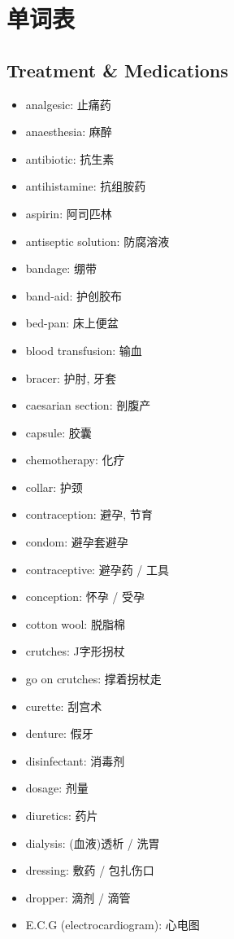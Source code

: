 \chapter{单词表}
\section{Treatment \& Medications}
\begin{multicols}{2}
\begin{itemize}
  \itemsep0em
  \item analgesic: 止痛药
  \item anaesthesia: 麻醉
  \item antibiotic: 抗生素
  \item antihistamine: 抗组胺药
  \item aspirin: 阿司匹林
  \item antiseptic solution: 防腐溶液
  \item bandage: 绷带
  \item band-aid: 护创胶布
  \item bed-pan: 床上便盆
  \item blood transfusion: 输血
  \item bracer: 护肘, 牙套
  \item caesarian section: 剖腹产
  \item capsule: 胶囊
  \item chemotherapy: 化疗
  \item collar: 护颈
  \item contraception: 避孕, 节育
  \item condom: 避孕套避孕
  \item contraceptive: 避孕药 / 工具
  \item conception: 怀孕 / 受孕
  \item cotton wool: 脱脂棉
  \item crutches: J字形拐杖
  \item go on crutches: 撑着拐杖走
  \item curette: 刮宫术
  \item denture: 假牙
  \item disinfectant: 消毒剂
  \item dosage: 剂量
  \item diuretics: 药片
  \item dialysis: (血液)透析 / 洗胃
  \item dressing: 敷药 / 包扎伤口
  \item dropper: 滴剂 / 滴管
  \item E.C.G (electrocardiogram): 心电图

\end{itemize}
\end{multicols}
